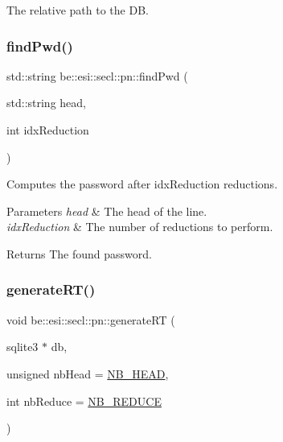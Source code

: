 The relative path to the DB. 

\mbox{\label{namespacebe_1_1esi_1_1secl_1_1pn_ae68f13fff76cabc930b60594c300a168}} 
\subsubsection{\texorpdfstring{find\+Pwd()}{findPwd()}}
{\footnotesize\ttfamily std\+::string be\+::esi\+::secl\+::pn\+::find\+Pwd (\begin{DoxyParamCaption}\item[{std\+::string}]{head,  }\item[{int}]{idx\+Reduction }\end{DoxyParamCaption})}



Computes the password after idx\+Reduction reductions. 


\begin{DoxyParams}{Parameters}
{\em head} & The head of the line. \\
\hline
{\em idx\+Reduction} & The number of reductions to perform. \\
\hline
\end{DoxyParams}
\begin{DoxyReturn}{Returns}
The found password. 
\end{DoxyReturn}
\mbox{\label{namespacebe_1_1esi_1_1secl_1_1pn_af8b773cad93b0eb78b89f69721e4bb1d}} 
\subsubsection{\texorpdfstring{generate\+R\+T()}{generateRT()}}
{\footnotesize\ttfamily void be\+::esi\+::secl\+::pn\+::generate\+RT (\begin{DoxyParamCaption}\item[{sqlite3 $\ast$}]{db,  }\item[{unsigned}]{nb\+Head = {\ttfamily \hyperlink{namespacebe_1_1esi_1_1secl_1_1pn_a3f7aaccb1bf4e47f92d72bf9b2471328}{N\+B\+\_\+\+H\+E\+AD}},  }\item[{int}]{nb\+Reduce = {\ttfamily \hyperlink{namespacebe_1_1esi_1_1secl_1_1pn_a9434f9e96778e243fcb677633df38598}{N\+B\+\_\+\+R\+E\+D\+U\+CE}} }\end{DoxyParamCaption})}



